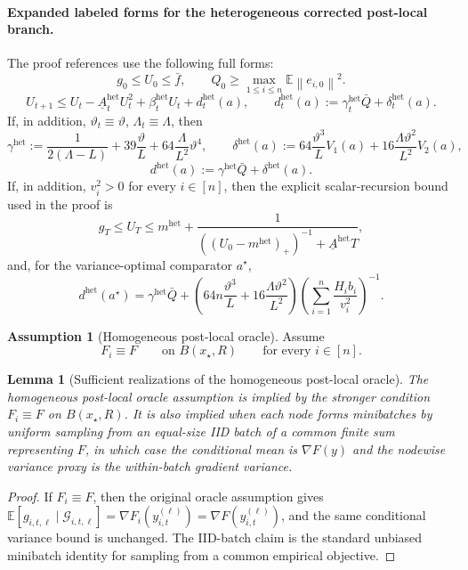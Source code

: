 \documentclass{article}
\newtheorem{lemma}[theorem]{Lemma}
\theoremstyle{definition}
\newtheorem{assumption}[theorem]{Assumption}
\newcommand{\EE}{\mathbb E}
\newcommand{\cG}{\mathcal G}
\newcommand{\norm}[1]{\left\lVert #1\right\rVert}
\begin{document}
\paragraph{Expanded labeled forms for the heterogeneous corrected post-local branch.}
The proof references use the following full forms:
\[
g_0\le U_0\le \bar f,
\qquad
Q_0\ge \max_{1\le i\le n}\EE\norm{e_{i,0}}^2.
\]
\[
U_{t+1}
\le
U_t-\underline A_t^{\mathrm{het}}U_t^2+\beta_t^{\mathrm{het}}U_t+d_t^{\mathrm{het}}(a),
\qquad
d_t^{\mathrm{het}}(a):=\gamma_t^{\mathrm{het}}\bar Q+\delta_t^{\mathrm{het}}(a).
\]
If, in addition, $
\vartheta_t\equiv \vartheta$,
$\Lambda_t\equiv \Lambda$,
then
\[
\gamma^{\mathrm{het}}
:=
\frac{1}{2(\Lambda-L)}
+
39\frac{\vartheta}{L}
+
64\frac{\Lambda}{L^2}\vartheta^4,
\qquad
\delta^{\mathrm{het}}(a)
:=
64\frac{\vartheta^3}{L}V_1(a)
+
16\frac{\Lambda\vartheta^2}{L^2}V_2(a),
\]
\[
d^{\mathrm{het}}(a):=\gamma^{\mathrm{het}}\bar Q+\delta^{\mathrm{het}}(a).
\]
If, in addition, $
v_i^2>0$ for every $i\in[n]$,
then the explicit scalar-recursion bound used in the proof is
\[
g_T\le U_T
\le
m^{\mathrm{het}}
+
\frac{1}{((U_0-m^{\mathrm{het}})_+)^{-1}+\underline A^{\mathrm{het}}T},
\]
and, for the variance-optimal comparator $a^\star$,
\[
d^{\mathrm{het}}(a^\star)
=
\gamma^{\mathrm{het}}\bar Q
+
\left(
64n\frac{\vartheta^3}{L}
+
16\frac{\Lambda\vartheta^2}{L^2}
\right)
\left(\sum_{i=1}^n \frac{H_i b_i}{v_i^2}\right)^{-1}.
\]

\begin{assumption}[Homogeneous post-local oracle]
\label{ass:realized-hom-exact}
Assume
\[
F_i\equiv F
\qquad
\text{on }B(x_\star,R)
\qquad
\text{for every }i\in[n].
\]
\end{assumption}

\begin{lemma}[Sufficient realizations of the homogeneous post-local oracle]
\label{lem:postlocal-hom-sufficient}
The homogeneous post-local oracle assumption is implied by the stronger condition $F_i\equiv F$ on $B(x_\star,R)$. It is also implied when each node forms minibatches by uniform sampling from an equal-size IID batch of a common finite sum representing $F$, in which case the conditional mean is $\nabla F(y)$ and the nodewise variance proxy is the within-batch gradient variance.
\end{lemma}

\begin{proof}
If $F_i\equiv F$, then the original oracle assumption gives $\EE[g_{i,t,\ell}\mid\cG_{i,t,\ell}]=\nabla F_i(y_{i,t}^{(\ell)})=\nabla F(y_{i,t}^{(\ell)})$, and the same conditional variance bound is unchanged. The IID-batch claim is the standard unbiased minibatch identity for sampling from a common empirical objective.
\end{proof}
\end{document}
